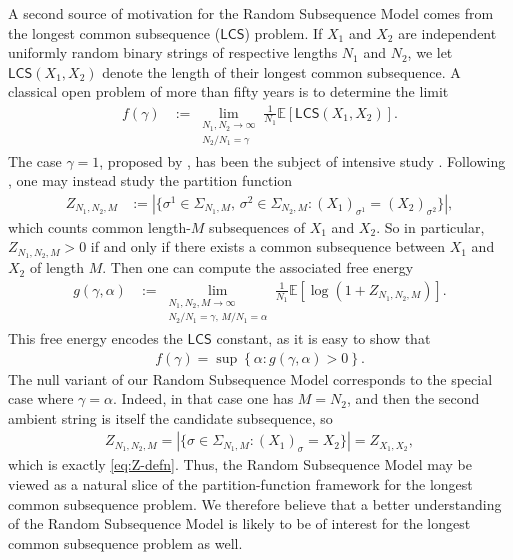 \documentclass[11pt]{amsart}
\numberwithin{equation}{section}
\numberwithin{equation}{section}
\newcommand{\1}{\mathbbm{1}}
\newcommand{\E}{\mathbb{E}}
\newcommand{\LCS}{\mathsf{LCS}}
\theoremstyle{definition}
\begin{document}
A second source of motivation for the Random Subsequence Model comes from the longest common subsequence ($\LCS$) problem. If $X_1$ and $X_2$ are independent uniformly random binary strings of respective lengths $N_1$ and $N_2$, we let $\LCS(X_1,X_2)$ denote the length of their longest common subsequence. A classical open problem of more than fifty years is to determine the limit
\begin{align*}
    f(\gamma)& := \lim_{\substack{N_1,N_2\to\infty \\ N_2/N_1 = \gamma}} \frac{1}{N_1} \E\left[ \LCS(X_1,X_2) \right].
\end{align*}
The case $\gamma=1$, proposed by \cite{chvatal1975longest}, has been the subject of intensive study \cite{deken1979limit, steele1982long, alexander1994rate, dancik1995upper, heineman2024improved}. Following \cite{boutetdemonvel1999extensive}, one may instead study the partition function
\begin{align*}
    Z_{N_1,N_2,M} & := |\{\sigma^1\in \Sigma_{N_1,M},\, \sigma^2\in \Sigma_{N_2,M} : (X_1)_{\sigma^1} = (X_2)_{\sigma^2}\}|,
\end{align*}
which counts common length-$M$ subsequences of $X_1$ and $X_2$. So in particular, $Z_{N_1,N_2,M} > 0$ if and only if there exists a common subsequence between $X_1$ and $X_2$ of length $M$. Then one can compute the associated free energy
\begin{align*}
    g(\gamma, \alpha) & := \lim_{\substack{N_1,N_2,M\to\infty \\ N_2/N_1 = \gamma,\, M/N_1 = \alpha}} \frac{1}{N_1} \E\left[ \log (1+Z_{N_1,N_2,M}) \right].
\end{align*}
This free energy encodes the $\LCS$ constant, as it is easy to show that
\begin{align*}
    f(\gamma) = \sup\left\{\alpha : g(\gamma,\alpha) > 0 \right\}.
\end{align*}
The null variant of our Random Subsequence Model corresponds to the special case where $\gamma = \alpha.$ Indeed, in that case one has $M=N_2$, and then the second ambient string is itself the candidate subsequence, so
\begin{align*}
    Z_{N_1,N_2,M} = |\{\sigma\in \Sigma_{N_1,M}: (X_1)_{\sigma} = X_2\}| = Z_{X_1, X_2},
\end{align*}
which is exactly \eqref{eq:Z-defn}. Thus, the Random Subsequence Model may be viewed as a natural slice of the partition-function framework for the longest common subsequence problem. We therefore believe that a better understanding of the Random Subsequence Model is likely to be of interest for the longest common subsequence problem as well.
\end{document}
